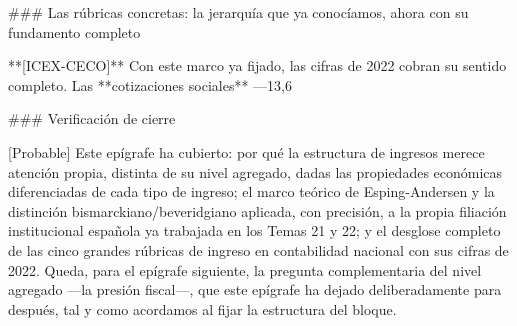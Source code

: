 \documentclass[10pt,a4paper]{article}
\begin{document}
### Las rúbricas concretas: la jerarquía que ya conocíamos, ahora con su fundamento completo

**[ICEX-CECO]** Con este marco ya fijado, las cifras de 2022 cobran su sentido completo. Las **cotizaciones sociales** —13,6%

### Verificación de cierre

[Probable] Este epígrafe ha cubierto: por qué la estructura de ingresos merece atención propia, distinta de su nivel agregado, dadas las propiedades económicas diferenciadas de cada tipo de ingreso; el marco teórico de Esping-Andersen y la distinción bismarckiano/beveridgiano aplicada, con precisión, a la propia filiación institucional española ya trabajada en los Temas 21 y 22; y el desglose completo de las cinco grandes rúbricas de ingreso en contabilidad nacional con sus cifras de 2022. Queda, para el epígrafe siguiente, la pregunta complementaria del nivel agregado —la presión fiscal—, que este epígrafe ha dejado deliberadamente para después, tal y como acordamos al fijar la estructura del bloque.
\end{document}
